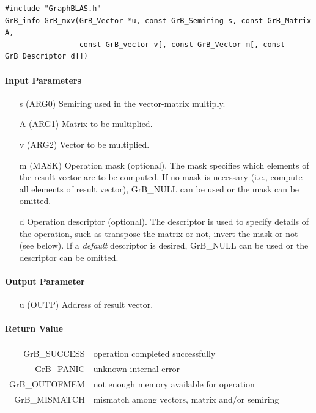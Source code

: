 \documentclass[11pt]{extarticle}
\begin{document}
\begin{verbatim}
#include "GraphBLAS.h"
GrB_info GrB_mxv(GrB_Vector *u, const GrB_Semiring s, const GrB_Matrix A, 
                 const GrB_vector v[, const GrB_Vector m[, const GrB_Descriptor d]])
\end{verbatim}

\paragraph{Input Parameters}

\begin{itemize}
	\item[{\sf s}] ({\sf ARG0}) Semiring used in the vector-matrix
	multiply.

	\item[{\sf A}] ({\sf ARG1}) Matrix to be multiplied.

	\item[{\sf v}] ({\sf ARG2}) Vector to be multiplied.

	\item[{\sf m}] ({\sf MASK}) Operation mask (optional). The mask
	specifies which elements of the result vector are to be computed.
	If no mask is necessary (i.e., compute all elements of result
	vector), {\sf GrB\_NULL} can be used or the mask can be omitted.

	\item[{\sf d}] Operation descriptor (optional). The descriptor
	is used to specify details of the operation, such as transpose
	the matrix or not, invert the mask or not (see below). If a
	\emph{default} descriptor is desired, {\sf GrB\_NULL} can be
	used or the descriptor can be omitted.
\end{itemize}

\paragraph{Output Parameter}

\begin{itemize}
	\item[{\sf u}] ({\sf OUTP}) Address of result vector.
\end{itemize}

\paragraph{Return Value}

\begin{tabular}{rl} 
{\sf GrB\_SUCCESS} 	& operation completed successfully \\
{\sf GrB\_PANIC}	& unknown internal error \\
{\sf GrB\_OUTOFMEM}	& not enough memory available for operation \\
{\sf GrB\_MISMATCH}	& mismatch among vectors, matrix and/or semiring
\end{tabular}
\end{document}
